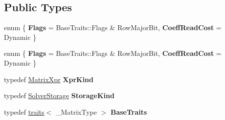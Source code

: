 \subsection*{Public Types}
\begin{DoxyCompactItemize}
\item 
\mbox{\label{struct_eigen_1_1internal_1_1traits_3_01_partial_piv_l_u_3_01___matrix_type_01_4_01_4_a3960aafd75e509c077ef5b08c38b842a}} 
enum \{ {\bfseries Flags} = Base\+Traits\+:\+:Flags \& Row\+Major\+Bit, 
{\bfseries Coeff\+Read\+Cost} = Dynamic
 \}
\item 
\mbox{\label{struct_eigen_1_1internal_1_1traits_3_01_partial_piv_l_u_3_01___matrix_type_01_4_01_4_ad4cd7035ed60cb0a16e2de24a24be02a}} 
enum \{ {\bfseries Flags} = Base\+Traits\+:\+:Flags \& Row\+Major\+Bit, 
{\bfseries Coeff\+Read\+Cost} = Dynamic
 \}
\item 
\mbox{\label{struct_eigen_1_1internal_1_1traits_3_01_partial_piv_l_u_3_01___matrix_type_01_4_01_4_abec48b37deb2eb7ec83cc857900538ba}} 
typedef \hyperlink{struct_eigen_1_1_matrix_xpr}{Matrix\+Xpr} {\bfseries Xpr\+Kind}
\item 
\mbox{\label{struct_eigen_1_1internal_1_1traits_3_01_partial_piv_l_u_3_01___matrix_type_01_4_01_4_a69d58e3e3f7626479141d277d46fbf18}} 
typedef \hyperlink{struct_eigen_1_1_solver_storage}{Solver\+Storage} {\bfseries Storage\+Kind}
\item 
\mbox{\label{struct_eigen_1_1internal_1_1traits_3_01_partial_piv_l_u_3_01___matrix_type_01_4_01_4_ac19dabf2a52fcbe37f8fd6ba52799704}} 
typedef \hyperlink{struct_eigen_1_1internal_1_1traits}{traits}$<$ \+\_\+\+Matrix\+Type $>$ {\bfseries Base\+Traits}
\item 
\mbox{\label{struct_eigen_1_1internal_1_1traits_3_01_partial_piv_l_u_3_01___matrix_type_01_4_01_4_abec48b37deb2eb7ec83cc857900538ba}} 

\end{DoxyCompactItemize}
